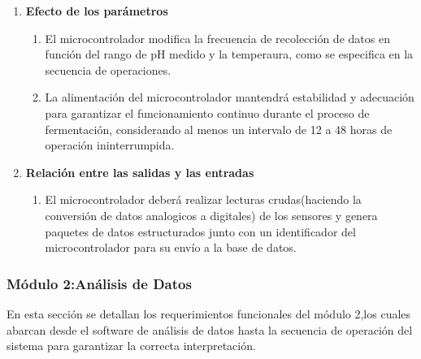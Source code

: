 \begin{enumerate}
\begin{enumerate}
            \item \textbf{Efecto de los parámetros}
                \begin{enumerate} 
                    \item El microcontrolador modifica la frecuencia de recolección de datos en función del rango de pH medido y la temperaura, como se especifica en la secuencia de operaciones.
                    \item La alimentación del microcontrolador mantendrá estabilidad y adecuación para garantizar el funcionamiento continuo durante el proceso de fermentación, considerando al menos un intervalo de 12 a 48 horas de operación ininterrumpida.
                \end{enumerate}   
        
            \item \textbf{Relación entre las salidas y las entradas}
                \begin{enumerate}
                    \item El microcontrolador deberá realizar lecturas crudas(haciendo la conversión de datos analogicos a digitales) de los sensores y genera paquetes de datos estructurados junto con un identificador del microcontrolador para su envío a la base de datos.
                \end{enumerate}
        \end{enumerate}

 \end{enumerate}

\newpage 


\subsubsection{Módulo 2:Análisis de Datos}
        En esta sección se detallan los requerimientos funcionales  del 
        módulo 2,los cuales abarcan desde el software de análisis de datos hasta la 
        secuencia de operación del sistema para garantizar la correcta interpretación.

